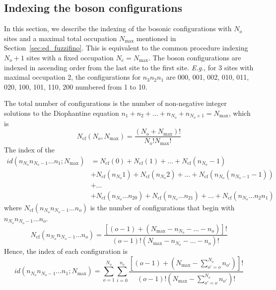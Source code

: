 \documentclass{timesjhep}
\begin{document}
\FloatBarrier

\subsection{Indexing the boson configurations}
\label{app:data_boson}

In this section, we describe the indexing of the bosonic configurations with $N_o$ sites and a maximal total occupation $N_{\max}$ mentioned in Section~\ref{sec:ed_fuzzifino}. This is equivalent to the common procedure indexing $N_o+1$ sites with a fixed occupation $N_e=N_{\max}$. The boson configurations are indexed in ascending order from the last site to the first site. \textit{E.g.}, for 3 sites with maximal occupation 2, the configurations for $n_3n_2n_1$ are 000, 001, 002, 010, 011, 020, 100, 101, 110, 200 numbered from 1 to 10. 

The total number of configurations is the number of non-negative integer solutions to the Diophantine equation $n_1+n_2+\dots+n_{N_o}+n_{N_o+1}=N_{\max}$, which is 
\begin{equation}
    N_\mathrm{cf}(N_o,N_{\max})=\frac{(N_o+N_{\max})!}{N_o!N_{\max}!}
\end{equation}
The index of the 
\begin{align}
    id(n_{N_o}n_{N_o-1}\dots n_1;N_{\max})&=N_\mathrm{cf}(0)+N_\mathrm{cf}(1)+\dots+N_\mathrm{cf}(n_{N_o}-1)\nonumber\\
    &+N_\mathrm{cf}(n_{N_o}1)+N_\mathrm{cf}(n_{N_o}2)+\dots+N_\mathrm{cf}(n_{N_o}(n_{N_o-1}-1))\nonumber\\
    &+\dots\nonumber\\
    &+N_\mathrm{cf}(n_{N_o}\dots n_20)+N_\mathrm{cf}(n_{N_o}\dots n_21)+\dots+N_\mathrm{cf}(n_{N_o}\dots n_2n_1)
\end{align}
where $N_\mathrm{cf}(n_{N_o}n_{N_o-1}\dots n_{o})$ is the number of configurations that begin with $n_{N_o}n_{N_o-1}\dots n_{o}$. 
\begin{equation}
    N_\mathrm{cf}(n_{N_o}n_{N_o-1}\dots n_{o})=\frac{[(o-1)+(N_{\max}-n_{N_o}-\dots-n_o)]!}{(o-1)!(N_{\max}-n_{N_o}-\dots-n_o)!}
\end{equation}
Hence, the index of each configuration is 
\begin{equation}
    id(n_{N_o}n_{N_o-1}\dots n_1;N_{\max})=\sum_{o=1}^{N_o}\sum_{i=0}^{n_o}\frac{\left[(o-1)+\left(N_{\max}-\sum_{o'=o}^{N_o}n_{o'}\right)\right]!}{(o-1)!\left(N_{\max}-\sum_{o'=o}^{N_o}n_{o'}\right)!}
\end{equation}
\end{document}
